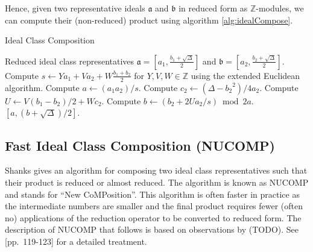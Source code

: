 \documentclass{ucalgthes1}
\theoremstyle{plain}
\theoremstyle{definition}
\newcommand{\ZZ}{\mathbb{Z}}
\begin{document}
\noindent
Hence, given two representative ideals $\mathfrak a$ and $\mathfrak b$ in reduced form as $\ZZ$-modules, we can compute their (non-reduced) product using algorithm \ref{alg:idealCompose}.

\begin{algorithm}[h!]
\caption{Ideal Class Composition}
\label{alg:idealCompose}
\begin{algorithmic}[1]
\REQUIRE Reduced ideal class representatives $\mathfrak a = \left[a_1, \frac{b_1 + \sqrt\Delta}{2}\right]$ and $\mathfrak b = \left[a_2, \frac{b_2 + \sqrt\Delta}{2}\right]$.
\STATE Compute $s \leftarrow Ya_1 + Va_2 + W\frac{b_1+b_2}{2}$ for $Y, V, W \in \ZZ$ using the extended Euclidean algorithm.
\STATE Compute $a \leftarrow (a_1a_2)/s$.
\STATE Compute $c_2 \leftarrow (\Delta-{b_2}^2)/4a_2$.
\STATE Compute $U \leftarrow V(b_1-b_2)/2 + Wc_2$.
\STATE Compute $b \leftarrow (b_2 + 2Ua_2/s) \bmod{2a}$.
\RETURN $[a, (b + \sqrt\Delta)/2]$.
\end{algorithmic}
\end{algorithm}

\subsection{Fast Ideal Class Composition (NUCOMP)}
\label{subsec:nucomp}
Shanks gives an algorithm for composing two ideal class representatives such that their product is reduced or almost reduced.  The algorithm is known as NUCOMP and stands for ``New CoMPosition''.  This algorithm is often faster in practice as the intermediate numbers are smaller and the final product requires fewer (often no) applications of the reduction operator to be converted to reduced form.  The description of NUCOMP that follows is based on observations by (TODO).  See \cite{Jac09}[pp.~119-123] for a detailed treatment.
\end{document}
